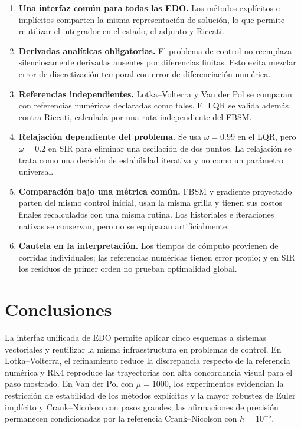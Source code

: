 \documentclass[11pt,a4paper]{article}
\begin{document}
\begin{enumerate}
    \item \textbf{Una interfaz común para todas las EDO.} Los métodos explícitos e implícitos comparten la misma representación de solución, lo que permite reutilizar el integrador en el estado, el adjunto y Riccati.

    \item \textbf{Derivadas analíticas obligatorias.} El problema de control no reemplaza silenciosamente derivadas ausentes por diferencias finitas. Esto evita mezclar error de discretización temporal con error de diferenciación numérica.

    \item \textbf{Referencias independientes.} Lotka--Volterra y Van der Pol se comparan con referencias numéricas declaradas como tales. El LQR se valida además contra Riccati, calculada por una ruta independiente del FBSM.

    \item \textbf{Relajación dependiente del problema.} Se usa $\omega=0.99$ en el LQR, pero $\omega=0.2$ en SIR para eliminar una oscilación de dos puntos. La relajación se trata como una decisión de estabilidad iterativa y no como un parámetro universal.

    \item \textbf{Comparación bajo una métrica común.} FBSM y gradiente proyectado parten del mismo control inicial, usan la misma grilla y tienen sus costos finales recalculados con una misma rutina. Los historiales e iteraciones nativas se conservan, pero no se equiparan artificialmente.

    \item \textbf{Cautela en la interpretación.} Los tiempos de cómputo provienen de corridas individuales; las referencias numéricas tienen error propio; y en SIR los residuos de primer orden no prueban optimalidad global.
\end{enumerate}

\section{Conclusiones}

La interfaz unificada de EDO permite aplicar cinco esquemas a sistemas vectoriales y reutilizar la misma infraestructura en problemas de control. En Lotka--Volterra, el refinamiento reduce la discrepancia respecto de la referencia numérica y RK4 reproduce las trayectorias con alta concordancia visual para el paso mostrado. En Van der Pol con $\mu=1000$, los experimentos evidencian la restricción de estabilidad de los métodos explícitos y la mayor robustez de Euler implícito y Crank--Nicolson con pasos grandes; las afirmaciones de precisión permanecen condicionadas por la referencia Crank--Nicolson con $h=10^{-5}$.
\end{document}
